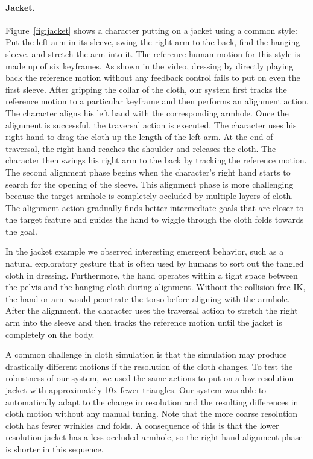 \paragraph{Jacket.} Figure~\ref{fig:jacket} shows a character putting on a
jacket using a common style: Put the left arm in its sleeve, swing the right arm to the back, find the hanging sleeve, and stretch the arm into it. The reference human motion for this style is made up of six keyframes. As shown in the video, dressing by directly playing back the reference motion without any feedback control fails to put on even the first sleeve. After gripping the collar of the cloth, our system first tracks the reference motion to a particular keyframe and then performs an alignment action. The character aligns his left hand with the corresponding armhole. Once the alignment is successful, the traversal action is executed. The character uses his right hand to drag the cloth up the length of the left arm. At the end of traversal, the right hand reaches the shoulder and releases the cloth. The character then swings his right arm to the back by tracking the reference motion. The second alignment phase begins when the character's right hand starts to search for the opening of the sleeve. This alignment phase is more challenging because the target armhole is completely occluded by multiple layers of cloth. The alignment action gradually finds better intermediate goals that are closer to the target feature and guides the hand to wiggle through the cloth folds towards the goal. 

In the jacket example we observed interesting emergent behavior, such as a natural exploratory gesture that is often used by humans to sort out the tangled cloth in dressing. Furthermore, the hand operates within a tight space between the pelvis and the hanging cloth during alignment. Without the collision-free IK, the hand or arm would penetrate the torso before aligning with the armhole. After the alignment, the character uses the traversal action to stretch the right arm into the sleeve and then tracks the reference motion until the jacket is completely on the body. 

A common challenge in cloth simulation is that the simulation may produce
drastically different motions if the resolution of the cloth changes. To
test the robustness of our system, we used the same actions to put on a
low resolution jacket with approximately 10x fewer triangles. Our system
was able to automatically adapt to the change in resolution and the
resulting differences in cloth motion without any manual tuning. Note that
the more coarse resolution cloth has fewer wrinkles and folds.  A
consequence of this is that the lower resolution jacket has a less occluded
armhole, so the right hand alignment phase is shorter in this sequence.

